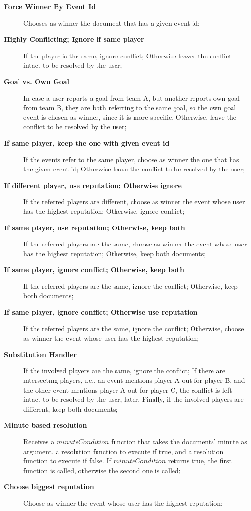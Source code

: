 \begin{description}
    \item[\textbf{Force Winner By Event Id}] Chooses as winner the document that has a given event id;
    \item[\textbf{Highly Conflicting; Ignore if same player}] If the player is the same, ignore conflict; Otherwise leaves the conflict intact to be resolved by the user;
    \item[\textbf{Goal vs. Own Goal}] In case a user reports a goal from team A, but another reports own goal from team B, they are both referring to the same goal, so the own goal event is chosen as winner, since it is more specific. Otherwise, leave the conflict to be resolved by the user;
    \item[\textbf{If same player, keep the one with given event id}] If the events refer to the same player, choose as winner the one that has the given event id; Otherwise leave the conflict to be resolved by the user;
    \item[\textbf{If different player, use reputation; Otherwise ignore}] If the referred players are different, choose as winner the event whose user has the highest reputation; Otherwise, ignore conflict;
    \item[\textbf{If same player, use reputation; Otherwise, keep both}] If the referred players are the same, choose as winner the event whose user has the highest reputation; Otherwise, keep both documents;
    \item[\textbf{If same player, ignore conflict; Otherwise, keep both}] If the referred players are the same, ignore the conflict; Otherwise, keep both documents;
    \item[\textbf{If same player, ignore conflict; Otherwise use reputation}] If the referred players are the same, ignore the conflict; Otherwise, choose as winner the event whose user has the highest reputation;
    \item[\textbf{Substitution Handler}] If the involved players are the same, ignore the conflict; If there are intersecting players, i.e., an event mentions player A out for player B, and the other event mentions player A out for player C, the conflict is left intact to be resolved by the user, later. Finally, if the involved players are different, keep both documents;
    \item[\textbf{Minute based resolution}] Receives a $minuteCondition$ function that takes the documents' minute as argument, a resolution function to execute if true, and a resolution function to execute if false. If $minuteCondition$ returns true, the first function is called, otherwise the second one is called;
    \item[\textbf{Choose biggest reputation}] Choose as winner the event whose user has the highest reputation;
\end{description}

